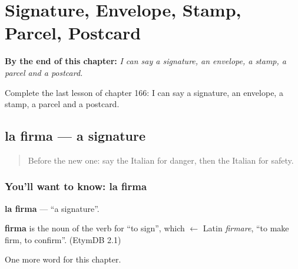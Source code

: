 
\chapter{Signature, Envelope, Stamp, Parcel, Postcard}
\label{ch:it-signature-envelope-stamp-parcel-postcard}

\begin{chapteropening}
\textbf{By the end of this chapter:} \emph{I can say a signature, an envelope, a stamp, a parcel and a postcard.}

Complete the last lesson of chapter 166: I can say a signature, an envelope, a stamp, a parcel and a postcard.
\end{chapteropening}

\section[la firma]{la firma — a signature}

\label{lesson:IT-C166-firma}



\begin{quote}
Before the new one: say the Italian for danger, then the Italian for safety.
\end{quote}

\subsection*{You'll want to know: la firma}
\textbf{la firma} — \textquotedblleft{}a signature\textquotedblright{}.

\begin{cousinweb}
\textbf{firma} is the noun of the verb for \textquotedblleft{}to sign\textquotedblright{}, which $\leftarrow$ Latin \emph{firmare}, \textquotedblleft{}to make firm, to confirm\textquotedblright{}. (EtymDB 2.1)
\end{cousinweb}

\begin{grammarlens}[title={What you've built}]
One more word for this chapter.
\end{grammarlens}


